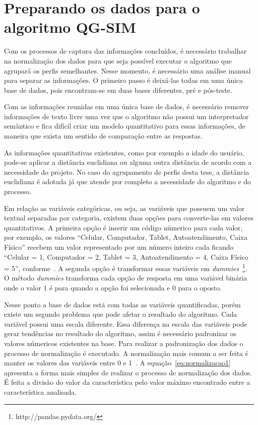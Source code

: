 \section{Preparando os dados para o algoritmo QG-SIM}
\label{sec:preparacao}
Com os processos de captura das informações concluídos, é necessário trabalhar na normalização dos dados para que seja possível executar o algoritmo que agrupará os perfis semelhantes. Nesse momento, é necessário uma análise manual para separar as informações. O primeiro passo é deixá-las todas em uma única base de dados, pois encontram-se em duas bases diferentes, pré e pós-teste.

Com as informações reunidas em uma única base de dados, é necessário remover informações de texto livre uma vez que o algoritmo não possui um interpretador semântico e fica difícil criar um modelo quantitativo para essas informações, de maneira que exista um sentido de comparação entre as respostas.

As informações quantitativas existentes, como por exemplo a idade do usuário, pode-se aplicar a distância euclidiana ou alguma outra distância de acordo com a necessidade do projeto. No caso do agrupamento de perfis desta tese, a distância euclidiana é adotada já que atende por completo a necessidade do algoritmo e do processo.

Em relação as variáveis categóricas, ou seja, as variáveis que possuem um valor textual separadas por categoria, existem duas opções para converte-las em valores quantitativos. A primeira opção é inserir um código númerico para cada valor, por exemplo, os valores ``Celular, Computador, Tablet, Autoatendimento, Caixa Físico'' recebem um valor representado por um número inteiro cada ficando ``Celular = 1, Computador = 2, Tablet = 3, Autoatendimento = 4, Caixa Físico = 5'', conforme~. A segunda opção é transformar essas variáveis em \emph{dummies}~\footnote{http://pandas.pydata.org/}. O método \emph{dummies} transforma cada opção de resposta em uma variável binária onde o valor 1 é para quando a opção foi selecionada e 0 para o oposto.

Nesse ponto a base de dados está com todas as variáveis quantificadas, porém existe um segundo problema que pode afetar o resultado do algoritmo. Cada variável possui uma escala diferente. Essa diferença na escala das variáveis pode gerar tendências no resultado do algoritmo, assim é necessário padronizar os valores númericos existentes na base. Para realizar a padronização dos dados o processo de normalização é executado. A normalização mais comum a ser feita é manter os valores das variáveis entre 0 e 1~\cite{lattin:2011}. A equação~\ref{eq:normalizacao1} apresenta a forma mais simples de realizar o processo de normalização dos dados. É feita a divisão do valor da característica pelo valor máximo encontrado entre a característica analisada.

